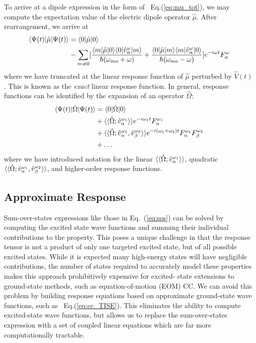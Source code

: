 {{{To arrive at a dipole expression in the form of ~Eq.(\ref{eq:mu_tot}), we may compute the expectation 
value of the electric dipole operator $\hat{\mu}$. After rearrangement, we arrive at
\begin{equation} \label{eq:sos}
    \begin{aligned}
    \langle\Psi(t) |\hat\mu| \Psi(t) \rangle &= \langle0 |\hat\mu| 0 \rangle \\ 
    &- \sum_{m\neq0}[\frac{\langle m |\hat\mu| 0 \rangle\langle0 |\hat{v}^\omega_\alpha| m \rangle}{\hbar(\omega_{mo}+\omega)}
        + \frac{\langle0 |\hat\mu| m \rangle\langle m |\hat{v}^\omega_\alpha| 0 \rangle}{\hbar(\omega_{mo}-\omega)}]
    e^{-i\omega t}F^\omega_\alpha
    \end{aligned}
\end{equation}
where we have truncated at the linear response function of $\hat{\mu}$ perturbed by $\hat{V}(t)$. This is known as the \textit{exact} linear response function. In general, 
response functions can be identified by the expansion of an operator $\hat\Omega$:
\begin{equation}
    \begin{aligned}
    \langle\Psi(t) |\hat\Omega| \Psi(t) \rangle &= \langle0 |\hat\Omega| 0 \rangle \\ 
    &+ \langle\langle\hat\Omega;\hat{v}^{\omega_1}_\alpha\rangle\rangle e^{-i\omega_1 t}F^{\omega_1}_\alpha \\ 
    &+ \langle\langle\hat\Omega;\hat{v}^{\omega_1}_\alpha,\hat{v}^{\omega_2}_\beta\rangle\rangle e^{-i(\omega_1+\omega_2)t}F^{\omega_1}_\alpha F^{\omega_2}_\beta \\
    &+ \ldots
    \end{aligned}
\end{equation}
where we have introduced notation for the linear $\langle\langle\hat\Omega;\hat{v}^{\omega_1}_\alpha\rangle\rangle$, 
quadratic $\langle\langle\hat\Omega;\hat{v}^{\omega_1}_\alpha,\hat{v}^{\omega_2}_\beta\rangle\rangle$, and higher-order response functions.

\subsection{Approximate Response} \label{ss:apprx}
Sum-over-states expressions like those in Eq.~(\ref{eq:sos}) can be solved by computing the excited state wave functions and 
summing their individual contributions to the property. This poses a unique challenge in that the response tensor is not a product 
of only one targeted excited state, but of all possible excited states. 
While it is expected many high-energy states will have negligible contributions, the number of states 
required to accurately model these properties makes this approach prohibitively expensive for excited-
state extensions to ground-state  methods, such as equation-of-motion (EOM) CC. We can avoid this 
problem by building response equations based on approximate ground-state wave functions, such as ~Eq.(\ref{eq:cc_TISE}).
This eliminates the ability to compute excited-state wave functions, but allows us to replace the sum-over-states 
expression with a set of coupled linear equations which are far more computationally tractable.

}}}
